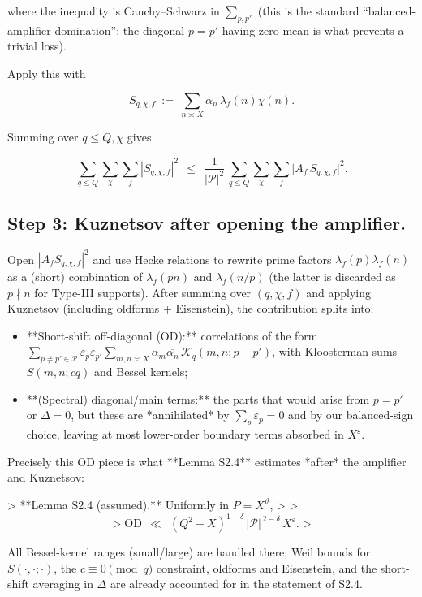\documentclass[11pt]{article}
\theoremstyle{definition}
\theoremstyle{remark}
\begin{document}
where the inequality is Cauchy–Schwarz in $\sum_{p,p'}$ (this is the standard “balanced-amplifier domination”: the diagonal $p=p'$ having zero mean is what prevents a trivial loss).

Apply this with

$$
S_{q,\chi,f}\ :=\ \sum_{n\asymp X}\alpha_n\,\lambda_f(n)\chi(n).
$$

Summing over $q\le Q,\chi$ gives

\begin{equation}
\sum_{q\le Q}\sum_{\chi}\sum_f |S_{q,\chi,f}|^2
\ \ \le\ \ \frac{1}{|\mathcal P|^2}\,
\sum_{q\le Q}\sum_{\chi}\sum_f \big|A_f\,S_{q,\chi,f}\big|^2.
\tag{3.1}
\end{equation}

\subsection*{Step 3: Kuznetsov after opening the amplifier.}
Open $|A_f S_{q,\chi,f}|^2$ and use Hecke relations to rewrite prime factors $\lambda_f(p)\lambda_f(n)$ as a (short) combination of $\lambda_f(pn)$ and $\lambda_f(n/p)$ (the latter is discarded as $p\nmid n$ for Type-III supports). After summing over $(q,\chi,f)$ and applying Kuznetsov (including oldforms + Eisenstein), the contribution splits into:

\begin{itemize}
\item **Short-shift off-diagonal (OD):** correlations of the form
  $\sum_{p\neq p'\in\mathcal P}\varepsilon_p\varepsilon_{p'}\sum_{m,n\asymp X}\alpha_m\overline{\alpha_n}\, \mathcal{K}_{q}(m, n; p-p')$,
  with Kloosterman sums $S(m,n;cq)$ and Bessel kernels;
\item **(Spectral) diagonal/main terms:** the parts that would arise from $p=p'$ or $\Delta=0$, but these are *annihilated* by $\sum_p\varepsilon_p=0$ and by our balanced-sign choice, leaving at most lower-order boundary terms absorbed in $X^{\varepsilon}$.
\end{itemize}

Precisely this OD piece is what **Lemma S2.4** estimates *after* the amplifier and Kuznetsov:

> **Lemma S2.4 (assumed).** Uniformly in $P=X^\vartheta$,
>
> $$
> \mathrm{OD}\ \ \ll\ \ (Q^2+X)^{1-\delta}\,|\mathcal P|^{\,2-\delta}\,X^{\varepsilon}.
> $$

All Bessel-kernel ranges (small/large) are handled there; Weil bounds for $S(\cdot,\cdot;\cdot)$, the $c\equiv0\pmod q$ constraint, oldforms and Eisenstein, and the short-shift averaging in $\Delta$ are already accounted for in the statement of S2.4.
\end{document}
